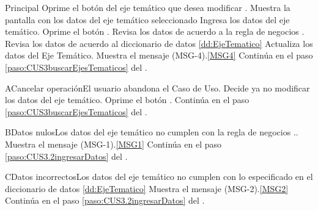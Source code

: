 	\begin{UCtrayectoria}{Principal}
			\UCpaso[\UCactor] Oprime el botón  del eje temático que desea modificar 
			.
			\UCpaso Muestra la pantalla  con los datos del eje temático seleccionado 
			\UCpaso [\UCactor] Ingresa los datos del eje temático.\label{paso:CUS3.2ingresarDatos}
			\UCpaso [\UCactor] Oprime el botón .
			\UCpaso Revisa los datos de acuerdo a la regla de negocios . 
			\UCpaso	Revisa los datos de acuerdo al diccionario de datos \ref{dd:EjeTematico} 
			\UCpaso Actualiza los datos del Eje Temático.
			\UCpaso Muestra el mensaje (MSG-4).\ref{MSG4}
			\UCpaso Continúa en el paso \ref{paso:CUS3buscarEjesTematicos} del .
	\end{UCtrayectoria}
	\newpage
		\begin{UCtrayectoriaA}{A}{Cancelar operación}{El usuario abandona el Caso de Uso.}
			\UCpaso[\UCactor] Decide ya no modificar los datos del eje temático.
			\UCpaso[\UCactor] Oprime el botón .
			\UCpaso Continúa en el paso \ref{paso:CUS3buscarEjesTematicos} del .
		\end{UCtrayectoriaA}
		
		 \begin{UCtrayectoriaA}{B}{Datos nulos}{Los datos del eje temático no cumplen con la regla de negocios ..}
			\UCpaso Muestra el mensaje (MSG-1).\ref{MSG1}
			\UCpaso Continúa en el paso \ref{paso:CUS3.2ingresarDatos} del .
		\end{UCtrayectoriaA}

		 \begin{UCtrayectoriaA}{C}{Datos incorrectos}{Los datos del eje temático no cumplen con lo especificado en el diccionario de datos \ref{dd:EjeTematico}}
			\UCpaso Muestra el mensaje (MSG-2).\ref{MSG2}
			\UCpaso Continúa en el paso \ref{paso:CUS3.2ingresarDatos} del .
		\end{UCtrayectoriaA}

